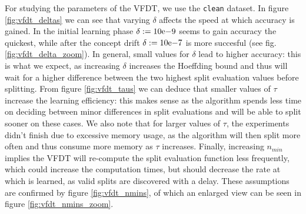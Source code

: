 \documentclass[12pt]{article}
\begin{document}
For studying the parameters of the VFDT, we use the \texttt{clean} dataset. In figure \ref{fig:vfdt_deltas} we can see that varying $\delta$ affects the speed at which accuracy is gained. In the initial learning phase $\delta := 10\mathrm{e}{-9}$ seems to gain accuracy the quickest, while after the concept drift $\delta := 10\mathrm{e}{-7}$ is more succesful (see fig. \ref{fig:vfdt_delta_zoom}). In general, small values for $\delta$ lead to higher accuracy: this is what we expect, as increasing $\delta$ increases the Hoeffding bound and thus will wait for a higher difference between the two highest split evaluation values before splitting. From figure \ref{fig:vfdt_taus} we can deduce that smaller values of $\tau$ increase the learning efficiency: this makes sense as the algorithm spends less time on deciding between minor differences in split evaluations and will be able to split sooner on these cases. We also note that for larger values of $\tau$, the experiments didn't finish due to excessive memory usage, as the algorithm will then split more often and thus consume more memory as $\tau$ increases. Finally, increasing $n_{min}$ implies the VFDT will re-compute the split evaluation function less frequently, which could increase the computation times, but should decrease the rate at which is learned, as valid splits are discovered with a delay. These assumptions are confirmed by figure \ref{fig:vfdt_nmins}, of which an enlarged view can be seen in figure \ref{fig:vfdt_nmins_zoom}.
\end{document}
